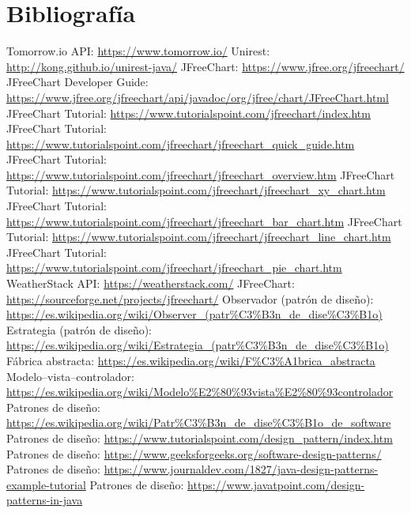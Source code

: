 \documentclass{article}
\begin{document}
\section{Bibliografía}
\begin{thebibliography}{99}
    \bibitem Tomorrow.io API: \url{https://www.tomorrow.io/}
    \bibitem Unirest: \url{http://kong.github.io/unirest-java/}
    \bibitem JFreeChart: \url{https://www.jfree.org/jfreechart/}
    \bibitem JFreeChart Developer Guide: \url{https://www.jfree.org/jfreechart/api/javadoc/org/jfree/chart/JFreeChart.html}
    \bibitem JFreeChart Tutorial: \url{https://www.tutorialspoint.com/jfreechart/index.htm}
    \bibitem JFreeChart Tutorial: \url{https://www.tutorialspoint.com/jfreechart/jfreechart_quick_guide.htm}
    \bibitem JFreeChart Tutorial: \url{https://www.tutorialspoint.com/jfreechart/jfreechart_overview.htm}
    \bibitem JFreeChart Tutorial: \url{https://www.tutorialspoint.com/jfreechart/jfreechart_xy_chart.htm}
    \bibitem JFreeChart Tutorial: \url{https://www.tutorialspoint.com/jfreechart/jfreechart_bar_chart.htm}
    \bibitem JFreeChart Tutorial: \url{https://www.tutorialspoint.com/jfreechart/jfreechart_line_chart.htm}
    \bibitem JFreeChart Tutorial: \url{https://www.tutorialspoint.com/jfreechart/jfreechart_pie_chart.htm}
    \bibitem WeatherStack API: \url{https://weatherstack.com/}
    \bibitem JFreeChart: \url{https://sourceforge.net/projects/jfreechart/}
    \bibitem Observador (patrón de diseño): \url{https://es.wikipedia.org/wiki/Observer_(patr%C3%B3n_de_dise%C3%B1o)}
    \bibitem Estrategia (patrón de diseño): \url{https://es.wikipedia.org/wiki/Estrategia_(patr%C3%B3n_de_dise%C3%B1o)}
    \bibitem Fábrica abstracta: \url{https://es.wikipedia.org/wiki/F%C3%A1brica_abstracta}
    \bibitem Modelo–vista–controlador: \url{https://es.wikipedia.org/wiki/Modelo%E2%80%93vista%E2%80%93controlador}
    \bibitem Patrones de diseño: \url{https://es.wikipedia.org/wiki/Patr%C3%B3n_de_dise%C3%B1o_de_software}
    \bibitem Patrones de diseño: \url{https://www.tutorialspoint.com/design_pattern/index.htm}
    \bibitem Patrones de diseño: \url{https://www.geeksforgeeks.org/software-design-patterns/}
    \bibitem Patrones de diseño: \url{https://www.journaldev.com/1827/java-design-patterns-example-tutorial}
    \bibitem Patrones de diseño: \url{https://www.javatpoint.com/design-patterns-in-java}
\end{thebibliography}
\end{document}
